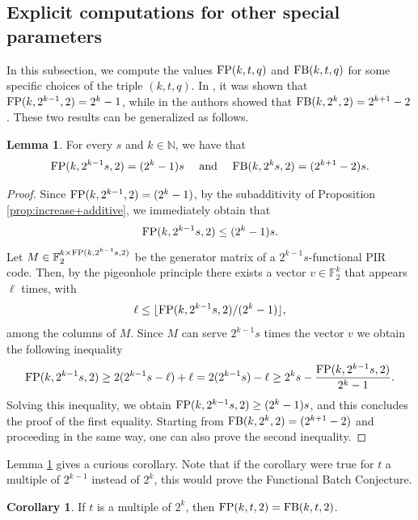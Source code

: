 \documentclass[11pt,a4paper]{article}
\theoremstyle{definition}
\newtheorem{lemma}[theorem]{Lemma}
\newtheorem{corollary}[theorem]{Corollary}
\newcommand{\N}{\mathbb N}
\newcommand{\F}{\mathbb F}
\newcommand{\fb}{\textnormal{FB}}
\newcommand{\fp}{\textnormal{FP}}
\begin{document}
\subsection{Explicit computations for other special parameters}

In this subsection, we compute the values $\fp(k,t,q)$ and $\fb(k,t,q)$ for some specific choices of the triple $(k,t,q)$.
In \cite[Theorem 7]{zhang2020bounds}, it was shown that $\fp(k,2^{k-1},2)=2^k-1$, while in \cite[Theorem 4]{yohananov2022almost} the authors showed that $\fb(k,2^k,2)=2^{k+1}-2$. These two results can be generalized as follows.  



\begin{lemma}\label{lemma:gencostr}
For every $s$ and $k\in\N$, we have that
\begin{equation*}
    \fp(k,2^{k-1}s,2)=(2^k-1)s \quad \text{ and } \quad \fb(k,2^{k}s,2)=(2^{k+1}-2)s.
\end{equation*}
\end{lemma}
\begin{proof}
    Since $\fp(k,2^{k-1},2)=(2^k-1)$, by the subadditivity of Proposition \ref{prop:increase+additive}, we immediately obtain that $$\fp(k,2^{k-1}s,2)\leq(2^k-1)s.$$
    Let $M\in\F_2^{k\times\fp(k,2^{k-1}s,2)}$ be the generator matrix of a $2^{k-1}s$-functional PIR code. Then, by the pigeonhole principle there exists a vector $v\in \F_2^k$ that appears $\ell$ times, with $$\ell\leq\lfloor \fp(k,2^{k-1}s,2)/(2^k-1)\rfloor,$$ among the columns of $M$. Since $M$ can serve $2^{k-1}s$ times the vector $v$ we obtain the following inequality
    \begin{equation*}
        \fp(k,2^{k-1}s,2)\geq  2(2^{k-1}s-\ell)+\ell =2(2^{k-1}s)-\ell\geq 2^ks-\frac{\fp(k,2^{k-1}s,2)}{2^k-1}.
    \end{equation*}
    Solving this inequality, we obtain $\fp(k,2^{k-1}s,2)\geq (2^k-1)s$, and this concludes the proof of the first equality. Starting from $\fb(k,2^{k},2)=(2^{k+1}-2)$ and proceeding in the same way, one can also prove the second inequality.
\end{proof}

Lemma \ref{lemma:gencostr} gives a curious corollary. Note that if the corollary were true for $t$ a multiple of $2^{k-1}$ instead of $2^k$, this would prove the Functional Batch Conjecture.
\begin{corollary}
\label{cor:multiple2k}
If $t$ is a multiple of $2^k$, then $\fp(k,t,2)=\fb(k,t,2)$.
\end{corollary}
\end{document}

